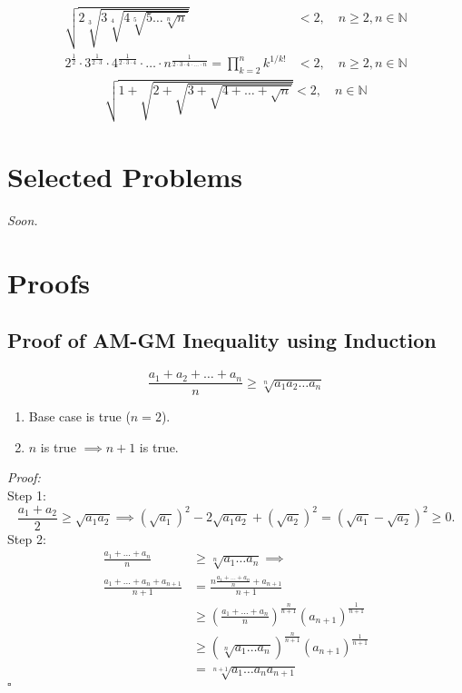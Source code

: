 \documentclass[a4paper,11pt]{article}
\begin{document}
\begin{equation}
    \begin{aligned}
        \sqrt{2\sqrt[3]{3\sqrt[4]{4\sqrt[5]{5\dots\sqrt[n]{n}}}}} &< 2, \quad n\geq2,n\in\mathbb{N} \\
        2^{\frac{1}{2}} \cdot 3^{\frac{1}{2\cdot3}} \cdot 4^{\frac{1}{2\cdot3\cdot4}} \cdot \ldots \cdot n^{{\frac{1}{2\cdot3\cdot4\cdot\ldots\cdot n}}} = \prod_{k=2}^n k^{1/k!} &< 2, \quad n\geq2,n\in\mathbb{N}
    \end{aligned}
\end{equation}
\vspace{13pt}
\begin{equation}
    \begin{aligned}
        \sqrt{1+\sqrt{2+\sqrt{3+\sqrt{4+\dots+\sqrt{n}}}}} < 2, \quad n\in\mathbb{N}
    \end{aligned}
\end{equation}
\vspace{13pt}


\section{Selected Problems}
\begin{center}
    \textit{Soon.}
\end{center}


\section{Proofs}
\subsection{Proof of AM-GM Inequality using Induction}
\begin{tcolorbox}[breakable]
    \[
    \frac{a_1 + a_2 + \dots + a_n}{n} \geq \sqrt[n]{a_1 a_2 \dots a_n}
    \]
    \begin{enumerate}[label=\roman*.]
        \item Base case is true ($n=2$).
        \item $n$ is true $\implies n+1$ is true.
    \end{enumerate}
    \emph{Proof:} \\[6pt]
    Step 1:
    \[
    \frac{a_1 + a_2}{2} \geq \sqrt{a_1 a_2} \implies (\sqrt{a_1})^2 - 2\sqrt{a_1 a_2} + (\sqrt{a_2})^2 = (\sqrt{a_1} - \sqrt{a_2})^2 \geq 0.
    \]
    Step 2:
    \begin{align*}
        \frac{a_1 + \dots + a_n}{n} &\geq \sqrt[n]{a_1 \dots a_n} \implies\\
        \frac{a_1 + \dots + a_n + a_{n+1}}{n+1} &= \frac{ n \frac{a_1 + \dots + a_n}{n} + a_{n+1}}{n+1} \\  &\geq \left( \frac{a_1 + \dots + a_n}{n} \right)^{\frac{n}{n+1}} (a_{n+1})^{\frac{1}{n+1}} \\
        &\geq \left( \sqrt[n]{a_1 \dots a_n} \right)^{\frac{n}{n+1}} (a_{n+1})^{\frac{1}{n+1}} \\
        &= \sqrt[n+1]{a_1 \dots a_n a_{n+1}} 
    \end{align*}
    \hfill$\square$
\end{tcolorbox}
\end{document}
